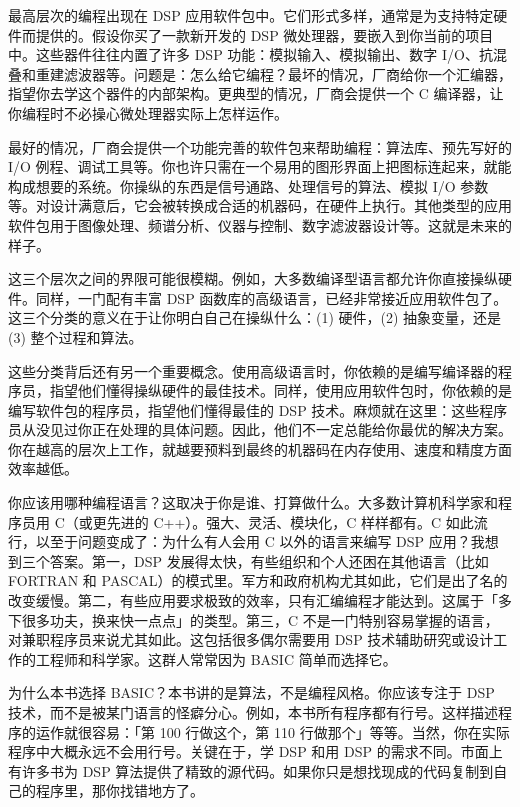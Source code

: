 最高层次的编程出现在 DSP
应用软件包中。它们形式多样，通常是为支持特定硬件而提供的。假设你买了一款新开发的
DSP 微处理器，要嵌入到你当前的项目中。这些器件往往内置了许多 DSP
功能：模拟输入、模拟输出、数字
I/O、抗混叠和重建滤波器等。问题是：怎么给它编程？最坏的情况，厂商给你一个汇编器，指望你去学这个器件的内部架构。更典型的情况，厂商会提供一个
C 编译器，让你编程时不必操心微处理器实际上怎样运作。

最好的情况，厂商会提供一个功能完善的软件包来帮助编程：算法库、预先写好的
I/O
例程、调试工具等。你也许只需在一个易用的图形界面上把图标连起来，就能构成想要的系统。你操纵的东西是信号通路、处理信号的算法、模拟
I/O
参数等。对设计满意后，它会被转换成合适的机器码，在硬件上执行。其他类型的应用软件包用于图像处理、频谱分析、仪器与控制、数字滤波器设计等。这就是未来的样子。

这三个层次之间的界限可能很模糊。例如，大多数编译型语言都允许你直接操纵硬件。同样，一门配有丰富
DSP
函数库的高级语言，已经非常接近应用软件包了。这三个分类的意义在于让你明白自己在操纵什么：(1)
硬件，(2) 抽象变量，还是 (3) 整个过程和算法。

这些分类背后还有另一个重要概念。使用高级语言时，你依赖的是编写编译器的程序员，指望他们懂得操纵硬件的最佳技术。同样，使用应用软件包时，你依赖的是编写软件包的程序员，指望他们懂得最佳的
DSP
技术。麻烦就在这里：这些程序员从没见过你正在处理的具体问题。因此，他们不一定总能给你最优的解决方案。你在越高的层次上工作，就越要预料到最终的机器码在内存使用、速度和精度方面效率越低。

你应该用哪种编程语言？这取决于你是谁、打算做什么。大多数计算机科学家和程序员用
C（或更先进的 C++）。强大、灵活、模块化，C 样样都有。C
如此流行，以至于问题变成了：为什么有人会用 C 以外的语言来编写 DSP
应用？我想到三个答案。第一，DSP
发展得太快，有些组织和个人还困在其他语言（比如 FORTRAN 和
PASCAL）的模式里。军方和政府机构尤其如此，它们是出了名的改变缓慢。第二，有些应用要求极致的效率，只有汇编编程才能达到。这属于「多下很多功夫，换来快一点点」的类型。第三，C
不是一门特别容易掌握的语言，对兼职程序员来说尤其如此。这包括很多偶尔需要用
DSP 技术辅助研究或设计工作的工程师和科学家。这群人常常因为 BASIC
简单而选择它。

为什么本书选择 BASIC？本书讲的是算法，不是编程风格。你应该专注于 DSP
技术，而不是被某门语言的怪癖分心。例如，本书所有程序都有行号。这样描述程序的运作就很容易：「第
100 行做这个，第 110
行做那个」等等。当然，你在实际程序中大概永远不会用行号。关键在于，学 DSP
和用 DSP 的需求不同。市面上有许多书为 DSP
算法提供了精致的源代码。如果你只是想找现成的代码复制到自己的程序里，那你找错地方了。

